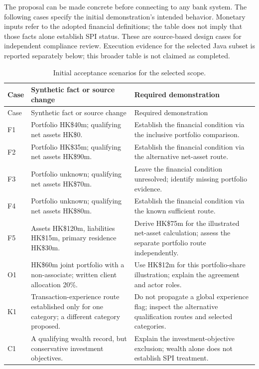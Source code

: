 \label{sec:evidence}

The proposal can be made concrete before connecting to any bank system. The
following cases specify the initial demonstration's intended behavior. Monetary
inputs refer to the adopted financial definitions; the table does not imply that
those facts alone establish SPI status. These are source-based design cases for
independent compliance review. Execution evidence for the selected Java subset
is reported separately below; this broader table is not claimed as completed.

\begingroup\small
\begin{longtable}{P{0.09\textwidth}P{0.41\textwidth}P{0.4\textwidth}}
\caption{Initial acceptance scenarios for the selected scope.}
\label{tab:cases}\\
\toprule Case & Synthetic fact or source change & Required demonstration \\\midrule
\endfirsthead
\toprule Case & Synthetic fact or source change & Required demonstration \\\midrule
\endhead
F1 & Portfolio HK\$40m; qualifying net assets HK\$0. & Establish the financial
condition via the inclusive portfolio comparison.\\
F2 & Portfolio HK\$35m; qualifying net assets HK\$90m. & Establish the financial
condition via the alternative net-asset route.\\
F3 & Portfolio unknown; qualifying net assets HK\$70m. & Leave the financial
condition unresolved; identify missing portfolio evidence.\\
F4 & Portfolio unknown; qualifying net assets HK\$80m. & Establish the financial
condition via the known sufficient route.\\
F5 & Assets HK\$120m, liabilities HK\$15m, primary residence HK\$30m. & Derive
HK\$75m for the illustrated net-asset calculation; assess the separate portfolio
route independently.\\
O1 & HK\$60m joint portfolio with a non-associate; written client allocation 20\%. &
Use HK\$12m for this portfolio-share illustration; explain the agreement and actor roles.\\
K1 & Transaction-experience route established only for one category; a different
category proposed. & Do not propagate a global experience flag; inspect the
alternative qualification routes and selected categories.\\
C1 & A qualifying wealth record, but conservative investment objectives. & Explain
the investment-objective exclusion; wealth alone does not establish SPI treatment.\\

\end{longtable}
